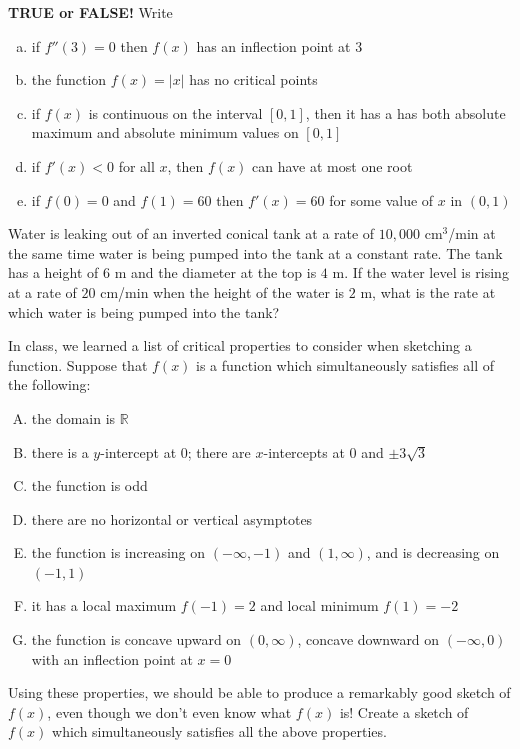 \documentclass[11pt]{exam}
\theoremstyle{definition}
\begin{document}
\begin{questions}

\addpoints

\question[10]\mbox{}
\textbf{TRUE or FALSE!}  Write 
\begin{enumerate}[(a)]
\item if $f''(3) = 0$ then $f(x)$ has an inflection point at $3$
\vspace{1.2in}
\item the function $f(x) = |x|$ has no critical points
\vspace{1.2in}
\item if $f(x)$ is continuous on the interval $[0,1]$, then it has a has both absolute maximum and absolute minimum values on $[0,1]$
\vspace{1.2in}
\item if $f'(x) < 0$ for all $x$, then $f(x)$ can have at most one root
\vspace{1.2in}
\item if $f(0)=0$ and $f(1)=60$ then $f'(x)=60$ for some value of $x$ in $(0,1)$
\vspace{1.2in}
\end{enumerate}

\newpage
\question[10]\mbox{}
Water is leaking out of an inverted conical tank at a rate of $10,000$ cm$^3$/min at the same time water is being pumped into the tank at a constant rate.
The tank has a height of $6$ m and the diameter at the top is $4$ m.
If the water level is rising at a rate of $20$ cm/min when the height of the water is $2$ m, what is the rate at which water is being pumped into the tank?

\newpage
\question[6]
In class, we learned a list of critical properties to consider when sketching a function.
Suppose that $f(x)$ is a function which simultaneously satisfies all of the following:
\begin{enumerate}[(A)]
\item the domain is $\mathbb{R}$
\item there is a $y$-intercept at $0$; there are $x$-intercepts at $0$ and $\pm 3\sqrt{3}$
\item the function is odd
\item there are no horizontal or vertical asymptotes
\item the function is increasing on $(-\infty,-1)$ and $(1,\infty)$, and is decreasing on $(-1,1)$
\item it has a local maximum $f(-1)=2$ and local minimum $f(1)=-2$
\item the function is concave upward on $(0,\infty)$, concave downward on $(-\infty,0)$ with an inflection point at $x=0$
\end{enumerate}
Using these properties, we should be able to produce a remarkably good sketch of $f(x)$, even though we don't even know what $f(x)$ is!  Create a sketch of $f(x)$ which simultaneously satisfies all the above properties.


\end{questions}
\end{document}
